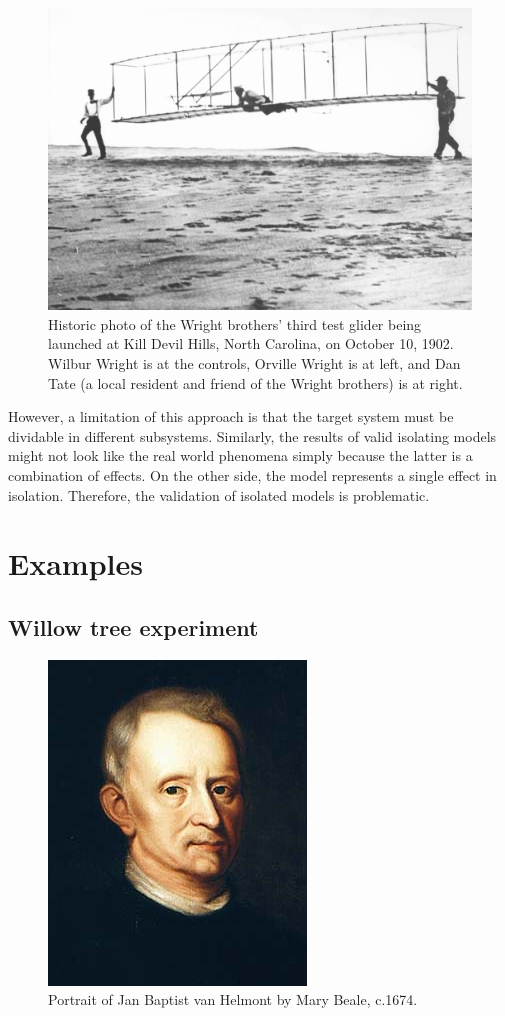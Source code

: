 \documentclass[
]{book}
\begin{document}
\begin{figure}[h]

{\centering \includegraphics[width=0.5\linewidth]{Figures/Wright_Brothers} 

}

\caption{Historic photo of the Wright brothers' third test glider being launched at Kill Devil Hills, North Carolina, on October 10, 1902. Wilbur Wright is at the controls, Orville Wright is at left, and Dan Tate (a local resident and friend of the Wright brothers) is at right.}\label{fig:brothers}
\end{figure}

However, a limitation of this approach is that the target system must be dividable in different subsystems. Similarly, the results of valid isolating models might not look like the real world phenomena simply because the latter is a combination of effects. On the other side, the model represents a single effect in isolation. Therefore, the validation of isolated models is problematic.

\hypertarget{examples-2}{%
\section{Examples}\label{examples-2}}

\hypertarget{willow}{%
\subsection{Willow tree experiment}\label{willow}}

\begin{figure}  
 \begin{center}
    \includegraphics[width=.22\textwidth]{Figures/Jan_Baptist_van_Helmont_portrait.jpg}  
  \captionsetup{labelformat=empty}
  \caption{Portrait of Jan Baptist van Helmont by Mary Beale, c.1674.} 
\end{center}
\end{figure}
\addtocounter{figure}{-1}
\end{document}
